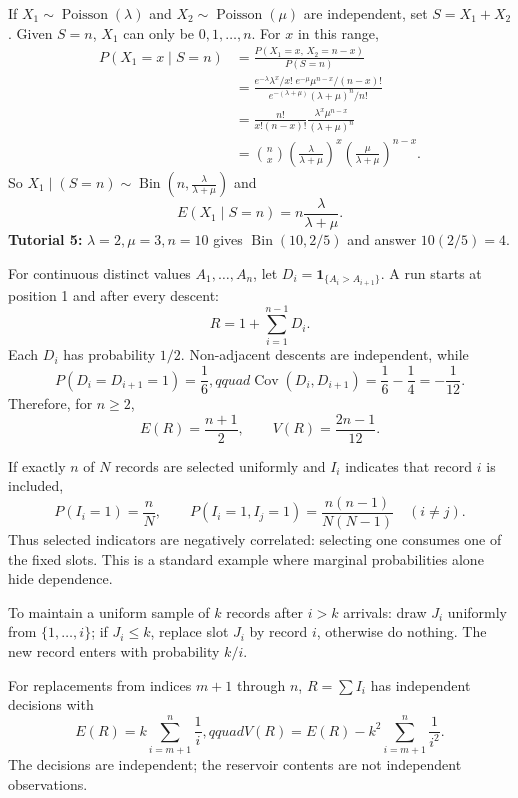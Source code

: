 \documentclass[10pt]{article}
\newcommand{\ind}[1]{\mathbf 1_{\{#1\}}}
\newcommand{\boxstart}[1]{\begin{tcolorbox}[title={#1},sharp corners]}
\newcommand{\boxend}{\end{tcolorbox}}
\begin{document}
\begin{multicols*}{3}
	\boxstart{Additional tutorial -- Q4: Poisson split given the total}
	If $X_1\sim\operatorname{Poisson}(\lambda)$ and $X_2\sim\operatorname{Poisson}(\mu)$ are independent, set $S=X_1+X_2$. Given $S=n$, $X_1$ can only be $0,1,\ldots,n$. For $x$ in this range,
	\[
		\begin{aligned}
			P(X_1=x\mid S=n)
			 & =\frac{P(X_1=x,\,X_2=n-x)}{P(S=n)}                        \\
			 & =\frac{e^{-\lambda}\lambda^x/x!\;e^{-\mu}\mu^{n-x}/(n-x)!}
			    {e^{-(\lambda+\mu)}(\lambda+\mu)^n/n!} \\
			 & =\frac{n!}{x!(n-x)!}\frac{\lambda^x\mu^{n-x}}
			                       {(\lambda+\mu)^n}              \\
			 & =\binom nx\left(\frac{\lambda}{\lambda+\mu}\right)^x
			\left(\frac{\mu}{\lambda+\mu}\right)^{n-x}.
		\end{aligned}
	\]
	So $X_1\mid(S=n)\sim\operatorname{Bin}\!\left(n,\frac{\lambda}{\lambda+\mu}\right)$ and
	\[
		E(X_1\mid S=n)=n\frac{\lambda}{\lambda+\mu}.
	\]
	\textbf{Tutorial 5:} $\lambda=2,\mu=3,n=10$ gives $\operatorname{Bin}(10,2/5)$ and answer $10(2/5)=4$.
	\boxend

	\boxstart{L4 — Runs in a random permutation}
	For continuous distinct values $A_1,\ldots,A_n$, let $D_i=\ind{A_i>A_{i+1}}$. A run starts at position 1 and after every descent:
	\[
		R=1+\sum_{i=1}^{n-1}D_i.
	\]
	Each $D_i$ has probability $1/2$. Non-adjacent descents are independent, while
	\[
		P(D_i=D_{i+1}=1)=\frac16,qquad
		\operatorname{Cov}(D_i,D_{i+1})=\frac16-\frac14=-\frac1{12}.
	\]
	Therefore, for $n\ge2$,
	\[
		E(R)=\frac{n+1}{2},\qquad V(R)=\frac{2n-1}{12}.
	\]
	\boxend

	\boxstart{L2/L4 — Fixed-size sampling dependence}
	If exactly $n$ of $N$ records are selected uniformly and $I_i$ indicates that record $i$ is included,
	\[
		P(I_i=1)=\frac nN,\qquad
		P(I_i=1,I_j=1)=\frac{n(n-1)}{N(N-1)}\quad(i\ne j).
	\]
	Thus selected indicators are negatively correlated: selecting one consumes one of the fixed slots. This is a standard example where marginal probabilities alone hide dependence.
	\boxend

	\boxstart{L5 — Reservoir sampling}
	To maintain a uniform sample of $k$ records after $i>k$ arrivals: draw $J_i$ uniformly from $\{1,\ldots,i\}$; if $J_i\le k$, replace slot $J_i$ by record $i$, otherwise do nothing. The new record enters with probability $k/i$.

	For replacements from indices $m+1$ through $n$, $R=\sum I_i$ has independent decisions with
	\[
		E(R)=k\sum_{i=m+1}^n\frac1i,qquad
		V(R)=E(R)-k^2\sum_{i=m+1}^n\frac1{i^2}.
	\]
	The decisions are independent; the reservoir contents are not independent observations.
	\boxend


\end{multicols*}
\end{document}
